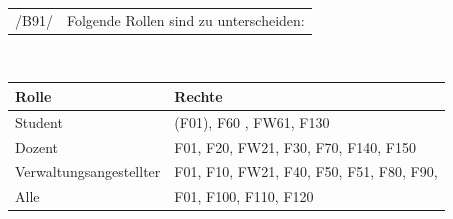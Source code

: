 \begin{tabular}{p{1.5cm}p{14.5cm}}
 /B91/	& Folgende Rollen sind zu unterscheiden: \\[0.25cm]	 
\end{tabular}\\


\begin{table}[h]
\begin{tabular}{l|l}
Rolle&Rechte\\
\hline
\hline
Student & (F01), F60 , FW61, F130 \\
\hline
Dozent & F01, F20, FW21, F30, F70, F140, F150  \\
\hline
Verwaltungsangestellter & F01, F10, FW21, F40, F50, F51, F80, F90,  \\
\hline
Alle & F01, F100, F110, F120
\end{tabular}
\end{table}

